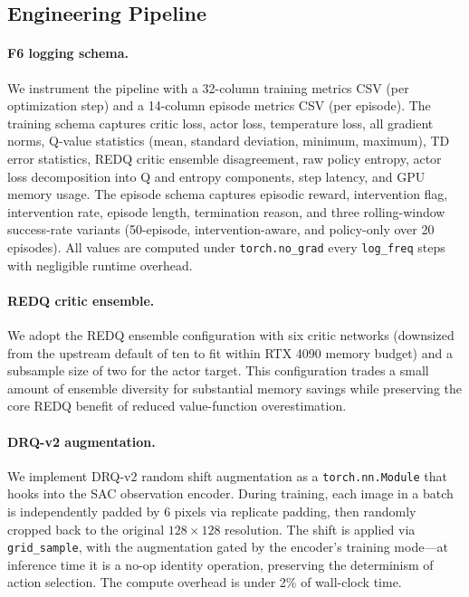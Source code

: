 \documentclass[12pt,a4paper]{article}
\begin{document}
\subsection{Engineering Pipeline}

\paragraph{F6 logging schema.} We instrument the pipeline with a 32-column training metrics CSV (per optimization step) and a 14-column episode metrics CSV (per episode). The training schema captures critic loss, actor loss, temperature loss, all gradient norms, Q-value statistics (mean, standard deviation, minimum, maximum), TD error statistics, REDQ critic ensemble disagreement, raw policy entropy, actor loss decomposition into Q and entropy components, step latency, and GPU memory usage. The episode schema captures episodic reward, intervention flag, intervention rate, episode length, termination reason, and three rolling-window success-rate variants (50-episode, intervention-aware, and policy-only over 20 episodes). All values are computed under \texttt{torch.no\_grad} every \texttt{log\_freq} steps with negligible runtime overhead.

\paragraph{REDQ critic ensemble.} We adopt the REDQ \citep{chen2021randomized} ensemble configuration with six critic networks (downsized from the upstream default of ten to fit within RTX 4090 memory budget) and a subsample size of two for the actor target. This configuration trades a small amount of ensemble diversity for substantial memory savings while preserving the core REDQ benefit of reduced value-function overestimation.

\paragraph{DRQ-v2 augmentation.} We implement DRQ-v2 random shift augmentation \citep{yarats2021mastering} as a \texttt{torch.nn.Module} that hooks into the SAC observation encoder. During training, each image in a batch is independently padded by 6 pixels via replicate padding, then randomly cropped back to the original $128 \times 128$ resolution. The shift is applied via \texttt{grid\_sample}, with the augmentation gated by the encoder's training mode---at inference time it is a no-op identity operation, preserving the determinism of action selection. The compute overhead is under 2\% of wall-clock time.
\end{document}
